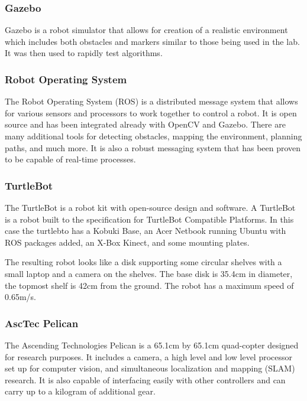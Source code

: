 \documentclass{article}
\begin{document}
		\subsubsection{Gazebo}
		
		Gazebo is a robot simulator that allows for creation of a realistic environment which includes both obstacles and markers similar to those being used in the lab. It was then used to rapidly test algorithms.
		
		\subsubsection{Robot Operating System}
		
		The Robot Operating System (ROS) is a distributed message system that allows for various sensors and processors to work together to control a robot. It is open source and has been integrated already with OpenCV and Gazebo. There are many additional tools for detecting obstacles, mapping the environment, planning paths, and much more. It is also a robust messaging system that has been proven to be capable of real-time processes.
		
		\subsubsection{TurtleBot}
		
		The TurtleBot is a robot kit with open-source design and software. A TurtleBot is a robot built to the specification for TurtleBot Compatible Platforms\cite{wise_foote_2011}. In this case the turtlebto has a Kobuki Base, an Acer Netbook running Ubuntu with ROS packages added, an X-Box Kinect, and some mounting plates. 
		
		The resulting robot looks like a disk supporting some circular shelves with a small laptop and a camera on the shelves. The base disk is 35.4cm in diameter, the topmost shelf is 42cm from the ground. The robot has a maximum speed of 0.65m/s. 
		
		\subsubsection{AscTec Pelican}
		
		The Ascending Technologies Pelican is a 65.1cm by 65.1cm quad-copter designed for research purposes\cite{asctec}. It includes a camera, a high level and low level processor set up for computer vision, and simultaneous localization and mapping (SLAM) research. It is also capable of interfacing easily with other controllers and can carry up to a kilogram of additional gear.
\end{document}
